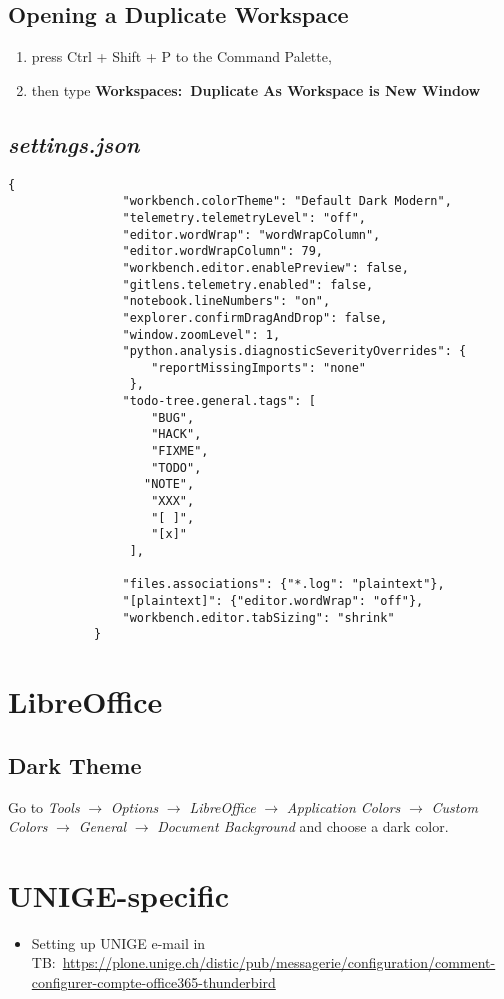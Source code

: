 \documentclass[12pt, a4paper]{article}
\numberwithin{equation}{section}
\theoremstyle{definition}
\theoremstyle{definition}
\begin{document}
	\subsection{Opening a Duplicate Workspace}
	
	\begin{enumerate}
		\item press Ctrl + Shift + P to the Command Palette, 
		\item then type \textbf{Workspaces:~Duplicate As Workspace is New Window}
	\end{enumerate}
	
	\subsection{\textit{settings.json}} \label{app:vscode__settings_file}
	
		\begin{lstlisting}[style=mystylebash, label=alg:vscode__settings_file, caption=Contents of settings.json file, xleftmargin=\parindent]
			{
				"workbench.colorTheme": "Default Dark Modern",
				"telemetry.telemetryLevel": "off",
				"editor.wordWrap": "wordWrapColumn",
				"editor.wordWrapColumn": 79,
				"workbench.editor.enablePreview": false,
				"gitlens.telemetry.enabled": false,
				"notebook.lineNumbers": "on",
				"explorer.confirmDragAndDrop": false,
				"window.zoomLevel": 1, 
				"python.analysis.diagnosticSeverityOverrides": {
				    "reportMissingImports": "none"
				 }, 
			 	"todo-tree.general.tags": [
				    "BUG",
				    "HACK",
				    "FIXME",
				    "TODO",
			 	   "NOTE",
				    "XXX",
				    "[ ]",
				    "[x]"
				 ],

				"files.associations": {"*.log": "plaintext"},
				"[plaintext]": {"editor.wordWrap": "off"}, 
				"workbench.editor.tabSizing": "shrink"
			}
		\end{lstlisting}
	
	\newpage 
	
	\section{LibreOffice}
	
	\subsection{Dark Theme}
	
		Go to \textit{Tools} $\rightarrow$ \textit{Options} $\rightarrow$ \textit{LibreOffice} $\rightarrow$ \textit{Application Colors} $\rightarrow$ \textit{Custom Colors} $\rightarrow$ \textit{General} $\rightarrow$ \textit{Document Background} and choose a dark color.

	\newpage 
	
	\section{UNIGE-specific}
	
	\begin{itemize}
		\item Setting up UNIGE e-mail in TB:~\newline\url{https://plone.unige.ch/distic/pub/messagerie/configuration/comment-configurer-compte-office365-thunderbird}
	\end{itemize}
	
\end{document}
